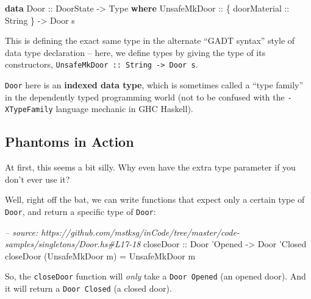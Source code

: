 \documentclass[]{article}
\newenvironment{Shaded}{}{}
\newcommand{\KeywordTok}[1]{\textcolor[rgb]{0.00,0.44,0.13}{\textbf{#1}}}
\newcommand{\DataTypeTok}[1]{\textcolor[rgb]{0.56,0.13,0.00}{#1}}
\newcommand{\CharTok}[1]{\textcolor[rgb]{0.25,0.44,0.63}{#1}}
\newcommand{\CommentTok}[1]{\textcolor[rgb]{0.38,0.63,0.69}{\textit{#1}}}
\newcommand{\OtherTok}[1]{\textcolor[rgb]{0.00,0.44,0.13}{#1}}
\newcommand{\FunctionTok}[1]{\textcolor[rgb]{0.02,0.16,0.49}{#1}}
\newcommand{\NormalTok}[1]{#1}
\begin{document}
\begin{Shaded}
\begin{Highlighting}[]
\KeywordTok{data} \DataTypeTok{Door}\OtherTok{ ::} \DataTypeTok{DoorState} \OtherTok{->} \DataTypeTok{Type} \KeywordTok{where}
    \DataTypeTok{UnsafeMkDoor}\OtherTok{ ::}\NormalTok{ \{}\OtherTok{ doorMaterial ::} \DataTypeTok{String}\NormalTok{ \} }\OtherTok{->} \DataTypeTok{Door}\NormalTok{ s}
\end{Highlighting}
\end{Shaded}

This is defining the exact same type in the alternate ``GADT syntax'' style of
data type declaration -- here, we define types by giving the type of its
constructors, \texttt{UnsafeMkDoor\ ::\ String\ -\textgreater{}\ Door\ s}.

\texttt{Door} here is an \textbf{indexed data type}, which is sometimes called a
``type family'' in the dependently typed programming world (not to be confused
with the \texttt{-XTypeFamily} language mechanic in GHC Haskell).

\subsection{Phantoms in Action}\label{phantoms-in-action}

At first, this seems a bit silly. Why even have the extra type parameter if you
don't ever use it?

Well, right off the bat, we can write functions that expect only a certain type
of \texttt{Door}, and return a specific type of \texttt{Door}:

\begin{Shaded}
\begin{Highlighting}[]
\CommentTok{-- source: https://github.com/mstksg/inCode/tree/master/code-samples/singletons/Door.hs#L17-18}
\OtherTok{closeDoor ::} \DataTypeTok{Door} \CharTok{'Opened -> Door '}\DataTypeTok{Closed}
\NormalTok{closeDoor (}\DataTypeTok{UnsafeMkDoor}\NormalTok{ m) }\FunctionTok{=} \DataTypeTok{UnsafeMkDoor}\NormalTok{ m}
\end{Highlighting}
\end{Shaded}

So, the \texttt{closeDoor} function will \emph{only} take a
\texttt{Door\ \textquotesingle{}Opened} (an opened door). And it will return a
\texttt{Door\ \textquotesingle{}Closed} (a closed door).
\end{document}
